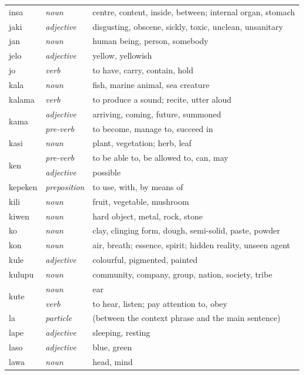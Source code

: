 \documentclass[14pt, a4paper]{extreport}
\begin{document}
\begin{longtable}{llp{10cm}}
  insa & \textit{noun} & centre, content, inside, between; internal organ, stomach \\
  jaki & \textit{adjective} & disgusting, obscene, sickly, toxic, unclean, unsanitary \\
  jan & \textit{noun} & human being, person, somebody \\
  jelo & \textit{adjective} & yellow, yellowish \\
  jo & \textit{verb} & to have, carry, contain, hold \\
  kala & \textit{noun} & fish, marine animal, sea creature \\
  kalama & \textit{verb} & to produce a sound; recite, utter aloud \\
  \multirow[t]{2}{*}{kama} & \textit{adjective} & arriving, coming, future, summoned \\
  & \textit{pre-verb} & to become, manage to, succeed in \\
  kasi & \textit{noun} & plant, vegetation; herb, leaf \\
  \multirow[t]{2}{*}{ken} & \textit{pre-verb} & to be able to, be allowed to, can, may \\
  & \textit{adjective} & possible \\
  kepeken & \textit{preposition} & to use, with, by means of \\
  kili & \textit{noun} & fruit, vegetable, mushroom \\
  kiwen & \textit{noun} & hard object, metal, rock, stone \\
  ko & \textit{noun} & clay, clinging form, dough, semi-solid, paste, powder \\
  kon & \textit{noun} & air, breath; essence, spirit; hidden reality, unseen agent \\
  kule & \textit{adjective} & colourful, pigmented, painted \\
  kulupu & \textit{noun} & community, company, group, nation, society, tribe \\
  \multirow[t]{2}{*}{kute} & \textit{noun} & ear \\
  & \textit{verb} & to hear, listen; pay attention to, obey \\
  la & \textit{particle} & (between the context phrase and the main sentence) \\
  lape & \textit{adjective} & sleeping, resting \\
  laso & \textit{adjective} & blue, green \\
  \multirow[t]{2}{*}{lawa} & \textit{noun} & head, mind \\

\end{longtable}
\end{document}
